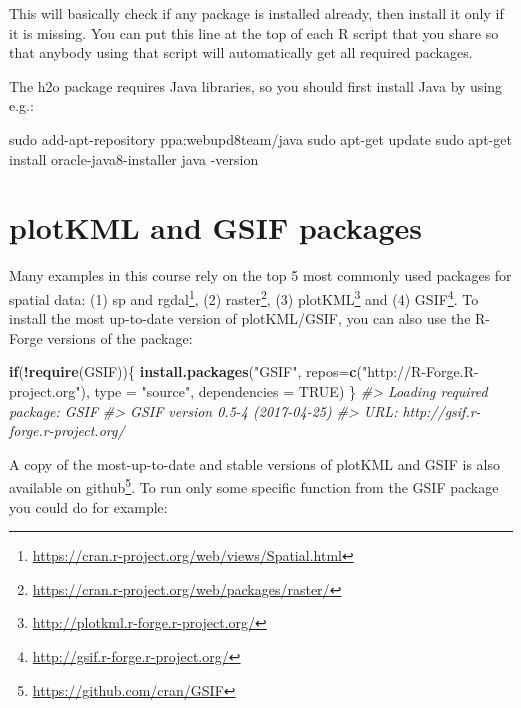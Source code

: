 \documentclass[11pt]{krantz}
\newenvironment{Shaded}{\begin{snugshade}}{\end{snugshade}}
\newcommand{\CommentTok}[1]{\textcolor[rgb]{0.37,0.37,0.37}{\textit{#1}}}
\newcommand{\ControlFlowTok}[1]{\textcolor[rgb]{0.27,0.27,0.27}{\textbf{#1}}}
\newcommand{\DataTypeTok}[1]{\textcolor[rgb]{0.27,0.27,0.27}{#1}}
\newcommand{\ExtensionTok}[1]{#1}
\newcommand{\FunctionTok}[1]{\textcolor[rgb]{0,0,0}{#1}}
\newcommand{\KeywordTok}[1]{\textcolor[rgb]{0.27,0.27,0.27}{\textbf{#1}}}
\newcommand{\NormalTok}[1]{#1}
\newcommand{\OperatorTok}[1]{\textcolor[rgb]{0.43,0.43,0.43}{\textbf{#1}}}
\newcommand{\OtherTok}[1]{\textcolor[rgb]{0.37,0.37,0.37}{#1}}
\newcommand{\StringTok}[1]{\textcolor[rgb]{0.5,0.5,0.5}{#1}}
\renewcommand{\href}[2]{#2\footnote{\url{#1}}}
\theoremstyle{definition}
\theoremstyle{definition}
\theoremstyle{definition}
\theoremstyle{remark}
\begin{document}
This will basically check if any package is installed already, then
install it only if it is missing. You can put this line at the top of
each R script that you share so that anybody using that script will
automatically get all required packages.

The h2o package requires Java libraries, so you should first install
Java by using e.g.:

\begin{Shaded}
\begin{Highlighting}[]
\FunctionTok{sudo}\NormalTok{ add-apt-repository ppa:webupd8team/java}
\FunctionTok{sudo}\NormalTok{ apt-get update}
\FunctionTok{sudo}\NormalTok{ apt-get install oracle-java8-installer}
\ExtensionTok{java}\NormalTok{ -version}
\end{Highlighting}
\end{Shaded}

\hypertarget{plotkml-and-gsif-packages}{%
\section{plotKML and GSIF packages}\label{plotkml-and-gsif-packages}}

Many examples in this course rely on the top 5 most commonly used
packages for spatial data: (1)
\href{https://cran.r-project.org/web/views/Spatial.html}{sp and rgdal},
(2) \href{https://cran.r-project.org/web/packages/raster/}{raster}, (3)
\href{http://plotkml.r-forge.r-project.org/}{plotKML} and (4)
\href{http://gsif.r-forge.r-project.org/}{GSIF}. To install the most
up-to-date version of plotKML/GSIF, you can also use the R-Forge
versions of the package:

\begin{Shaded}
\begin{Highlighting}[]
\ControlFlowTok{if}\NormalTok{(}\OperatorTok{!}\KeywordTok{require}\NormalTok{(GSIF))\{}
  \KeywordTok{install.packages}\NormalTok{(}\StringTok{"GSIF"}\NormalTok{, }\DataTypeTok{repos=}\KeywordTok{c}\NormalTok{(}\StringTok{"http://R-Forge.R-project.org"}\NormalTok{), }
                 \DataTypeTok{type =} \StringTok{"source"}\NormalTok{, }\DataTypeTok{dependencies =} \OtherTok{TRUE}\NormalTok{)}
\NormalTok{\}}
\CommentTok{#> Loading required package: GSIF}
\CommentTok{#> GSIF version 0.5-4 (2017-04-25)}
\CommentTok{#> URL: http://gsif.r-forge.r-project.org/}
\end{Highlighting}
\end{Shaded}

A copy of the most-up-to-date and stable versions of plotKML and GSIF is
also available on \href{https://github.com/cran/GSIF}{github}. To run
only some specific function from the GSIF package you could do for
example:
\end{document}

